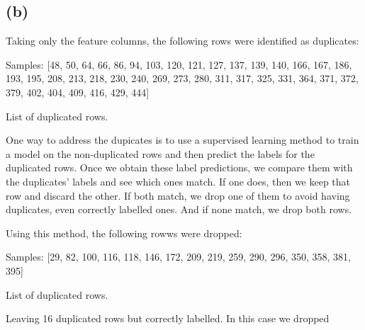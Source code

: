 \documentclass[12pt]{report} %
\begin{document}
\subsection*{(b)}

Taking only the feature columns, the following rows were identified as duplicates:

\begin{table}[h]
\centering
Samples: [48, 50, 64, 66, 86, 94, 103, 120, 121, 127, 137, 139, 140, 166, 167, 186, 193, 195,
208, 213, 218, 230, 240, 269, 273, 280, 311, 317, 325, 331, 364, 371, 372, 379, 402, 404,
409, 416, 429, 444]

\caption{List of duplicated rows.}
\end{table}

One way to address the dupicates is to use a supervised learning method to train a model on the non-duplicated rows and then predict the labels for the duplicated rows. Once we obtain these label predictions, we compare them with the duplicates' labels and see which ones match. If one does, then we keep that row and discard the other. If both match, we drop one of them to avoid having duplicates, even correctly labelled ones. And if none match, we drop both rows.

Using this method, the following rowws were dropped:

\begin{table}[h]
    \centering
    Samples: [29, 82, 100, 116, 118, 146, 172, 209, 219, 259, 290, 296, 350, 358, 381, 395]
    \caption{List of duplicated rows.}
\end{table}

Leaving 16 duplicated rows but correctly labelled. In this case we dropped



\end{document}
